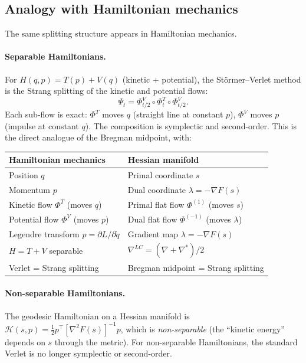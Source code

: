 \documentclass[11pt]{article}
\begin{document}
\subsection{Analogy with Hamiltonian mechanics}

The same splitting structure appears in Hamiltonian mechanics.

\paragraph{Separable Hamiltonians.}
For $H(q, p) = T(p) + V(q)$ (kinetic + potential), the St\"ormer--Verlet
method is the Strang splitting of the kinetic and potential flows:
\[
  \Psi_t = \Phi^V_{t/2} \circ \Phi^T_t \circ \Phi^V_{t/2}.
\]
Each sub-flow is exact: $\Phi^T$ moves $q$ (straight line at constant $p$),
$\Phi^V$ moves $p$ (impulse at constant $q$).  The composition is
symplectic and second-order.  This is the direct analogue of the
Bregman midpoint, with:
\begin{center}
\begin{tabular}{@{}ll@{}}
\toprule
\textbf{Hamiltonian mechanics} & \textbf{Hessian manifold} \\
\midrule
Position $q$ & Primal coordinate $s$ \\
Momentum $p$ & Dual coordinate $\lambda = -\nabla F(s)$ \\
Kinetic flow $\Phi^T$ (moves $q$) & Primal flat flow $\Phi^{(1)}$ (moves $s$) \\
Potential flow $\Phi^V$ (moves $p$) & Dual flat flow $\Phi^{(-1)}$ (moves $\lambda$) \\
Legendre transform $p = \partial L / \partial \dot{q}$ & Gradient map $\lambda = -\nabla F(s)$ \\
$H = T + V$ separable & $\nabla^{LC} = (\nabla + \nabla^*)/2$ \\
Verlet = Strang splitting & Bregman midpoint = Strang splitting \\
\bottomrule
\end{tabular}
\end{center}

\paragraph{Non-separable Hamiltonians.}
The geodesic Hamiltonian on a Hessian manifold is
$\mathcal{H}(s, p) = \frac{1}{2} p^\top [\nabla^2 F(s)]^{-1} p$,
which is \emph{non-separable} (the ``kinetic energy'' depends on $s$
through the metric).  For non-separable Hamiltonians, the standard
Verlet is no longer symplectic or second-order.
\end{document}
